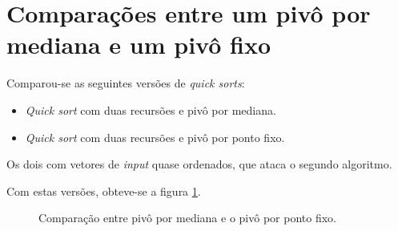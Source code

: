 \documentclass{article}[twocolumn]
\begin{document}
	\section{Compara\c{c}\~oes entre um piv\^o por mediana e um piv\^o fixo}
	Comparou-se as seguintes vers\~oes de \textit{quick sorts}:
	\begin{itemize}
		\item \textit{Quick sort} com duas recurs\~oes e piv\^o por mediana.
		\item \textit{Quick sort} com duas recurs\~oes e piv\^o por ponto fixo.
	\end{itemize}
	Os dois com vetores de \textit{input} quase ordenados, que ataca o segundo algoritmo.

	Com estas vers\~oes, obteve-se a figura \ref{fig:medianfixed}.
	\begin{figure}[H]
		\centering
		\caption{Compara\c{c}\~ao entre piv\^o por mediana e o piv\^o por ponto fixo.}
		\label{fig:medianfixed}
	\end{figure}
\end{document}
